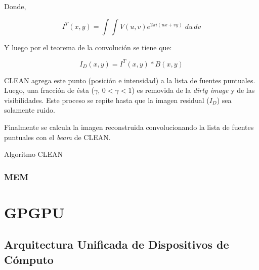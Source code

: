 Donde,

\begin{equation}
I^{T}(x,y) = \int\int V(u,v)e^{2\pi i(ux+vy)}\;du\,dv
\label{eq:fullcoverage}
\end{equation} 

Y luego por el teorema de la convolución se tiene que:

\begin{equation}
I_{D}(x,y) = I^{T}(x,y) \ast B(x,y)
\end{equation}

CLEAN agrega este punto (posición e intensidad) a la lista de fuentes puntuales. Luego, una fracción de ésta ($\gamma$, $0 < \gamma < 1$) es removida de la \textit{dirty image} y de las visibilidades. Este proceso se repite hasta que la imagen residual ($I_D$) sea solamente ruido.

Finalmente se calcula la imagen reconstruida convolucionando la lista de fuentes puntuales con el \textit{beam} de CLEAN.

\begin{algorithm}
\begin{algorithmic}[1]
        \ENDFOR
    \ENDWHILE
\end{algorithmic}
\label{alg:clean}
\caption{Algoritmo CLEAN}
\end{algorithm}


\subsection{MEM}

 
 










\chapter{GPGPU}
\label{cap:gpgpu}

\section{Arquitectura Unificada de Dispositivos de Cómputo}
